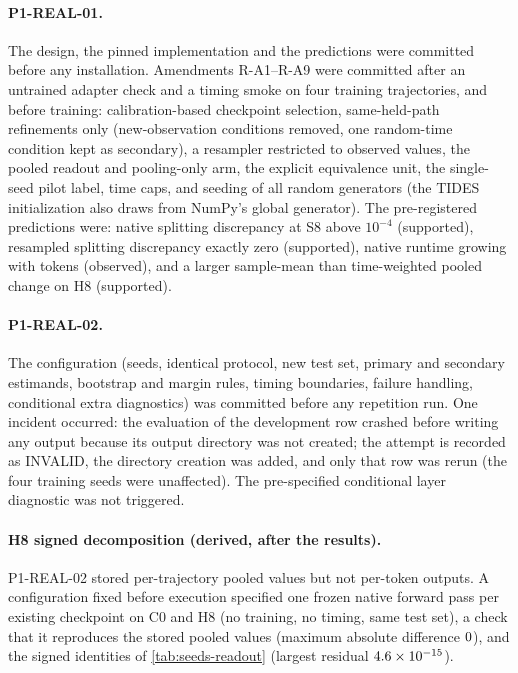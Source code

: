 \documentclass{article}
\theoremstyle{plain}
\theoremstyle{definition}
\theoremstyle{remark}
\begin{document}
\paragraph{P1-REAL-01.}
The design, the pinned implementation and the predictions were committed before any installation.
Amendments R-A1--R-A9 were committed after an untrained adapter check and a timing smoke on four training trajectories, and before training: calibration-based checkpoint selection, same-held-path refinements only (new-observation conditions removed, one random-time condition kept as secondary), a resampler restricted to observed values, the pooled readout and pooling-only arm, the explicit equivalence unit, the single-seed pilot label, time caps, and seeding of all random generators (the TIDES initialization also draws from NumPy's global generator).
The pre-registered predictions were: native splitting discrepancy at S8 above $10^{-4}$ (supported), resampled splitting discrepancy exactly zero (supported), native runtime growing with tokens (observed), and a larger sample-mean than time-weighted pooled change on H8 (supported).

\paragraph{P1-REAL-02.}
The configuration (seeds, identical protocol, new test set, primary and secondary estimands, bootstrap and margin rules, timing boundaries, failure handling, conditional extra diagnostics) was committed before any repetition run.
One incident occurred: the evaluation of the development row crashed before writing any output because its output directory was not created; the attempt is recorded as INVALID, the directory creation was added, and only that row was rerun (the four training seeds were unaffected).
The pre-specified conditional layer diagnostic was not triggered.

\paragraph{H8 signed decomposition (derived, after the results).}
P1-REAL-02 stored per-trajectory pooled values but not per-token outputs.
A configuration fixed before execution specified one frozen native forward pass per existing checkpoint on C0 and H8 (no training, no timing, same test set), a check that it reproduces the stored pooled values (maximum absolute difference $0$), and the signed identities of \cref{tab:seeds-readout} (largest residual $4.6\times10^{-15}$).
\end{document}

